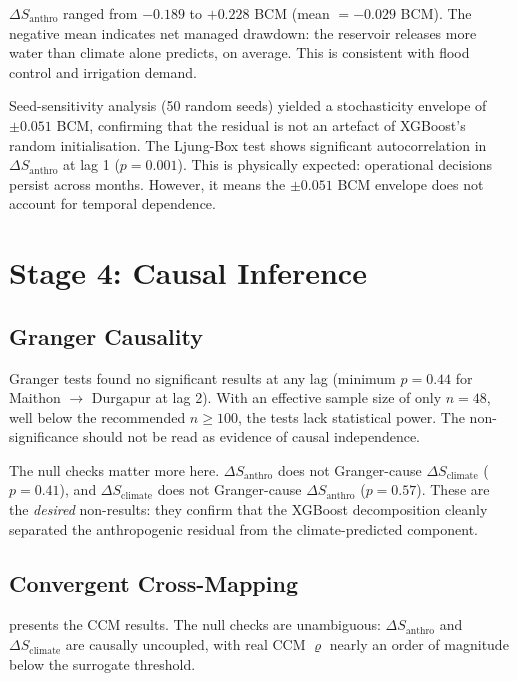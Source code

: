 \documentclass[12pt,a4paper,oneside]{report}
\newcommand{\dSclim}{\Delta S_{\mathrm{climate}}}
\newcommand{\dSanthro}{\Delta S_{\mathrm{anthro}}}
\begin{document}
$\dSanthro$ ranged from $-0.189$ to $+0.228$ BCM (mean $= -0.029$ BCM).
The negative mean indicates net managed drawdown: the reservoir releases
more water than climate alone predicts, on average. This is consistent with
flood control and irrigation demand.

Seed-sensitivity analysis (50 random seeds) yielded a stochasticity
envelope of $\pm 0.051$ BCM, confirming that the residual is not an
artefact of XGBoost's random initialisation. The Ljung-Box test shows
significant autocorrelation in $\dSanthro$ at lag 1 ($p = 0.001$). This is
physically expected: operational decisions persist across months. However,
it means the $\pm 0.051$ BCM envelope does not account for temporal
dependence.

\section{Stage 4: Causal Inference}

\subsection{Granger Causality}

Granger tests found no significant results at any lag (minimum $p = 0.44$
for Maithon $\to$ Durgapur at lag 2). With an effective sample size of only
$n = 48$, well below the recommended $n \geq 100$, the tests lack
statistical power. The non-significance should not be read as evidence of
causal independence.

The null checks matter more here. $\dSanthro$ does not Granger-cause
$\dSclim$ ($p = 0.41$), and $\dSclim$ does not Granger-cause $\dSanthro$
($p = 0.57$). These are the \textit{desired} non-results: they confirm that
the XGBoost decomposition cleanly separated the anthropogenic residual from
the climate-predicted component.

\subsection{Convergent Cross-Mapping}

 presents the CCM results. The null checks are
unambiguous: $\dSanthro$ and $\dSclim$ are causally uncoupled, with real CCM
$\varrho$ nearly an order of magnitude below the surrogate threshold.
\end{document}
